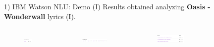\documentclass[xcolor=dvipsnames]{beamer}
\begin{document}
\begin{frame}{1) IBM Watson NLU: Demo (I)}
Results obtained analyzing \textbf{Oasis - Wonderwall} lyrics (I).
\begin{columns}
\begin{figure}
	\includegraphics[scale=0.3]{./images/sentiment}
\end{figure}
\begin{figure}
	\includegraphics[scale=0.3]{./images/emotion}
\end{figure}
\begin{figure}
	\includegraphics[scale=0.3]{./images/categories}
\end{figure}
\begin{figure}

\end{figure}
\end{columns}
\end{frame}
\end{document}
